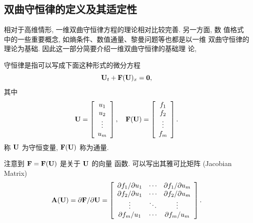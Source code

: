 \subsection{双曲守恒律的定义及其适定性}
\label{sec:hyperbolic-cl-def}

相对于高维情形, 一维双曲守恒律方程的理论相对比较完善. 另一方面, 数
值格式中的一些重要概念, 如熵条件、数值通量、黎曼问题等也都是以一维
双曲守恒律的理论为基础. 因此这一部分简要介绍一维双曲守恒律的基础理
论,
\begin{definition}
  守恒律是指可以写成下面这种形式的微分方程
  \begin{equation}
    \label{eq:conservation-law}
    {\bf{U}}_{t} + {\bf{F}}({\bf{U}})_{x} = {\bf{0}},
  \end{equation}
  其中
  \begin{equation}
    \label{eq:conserve-variable-and-vector-of-flux}
    {\bf{U}} = \left[
      \begin{array}{c}
        u_{1}\\
        u_{2}\\
        \vdots\\
        u_{m}
      \end{array}
    \right], \quad
    {\bf{F}}({\bf{U}}) = \left[
      \begin{array}{c}
        f_{1}\\
        f_{2}\\
        \vdots\\
        f_{m}
      \end{array}
    \right].
  \end{equation}
  称 ${\bf{U}}$ 为守恒变量, ${\bf{F}}({\bf{U}})$ 称为通量.
\end{definition}
注意到 ${\bf{F}} = {\bf{F}}({\bf{U}})$ 是关于 ${\bf{U}}$ 的向量
函数. 可以写出其雅可比矩阵 (Jacobian Matrix)
\begin{equation}
  \label{eq:jacobian-matrix-flux}
  {\bf{A}}({\bf{U}}) =
  {\partial {\bf{F}}}/{\partial {\bf{U}}} = \left[
    \begin{array}{ccc}
      \partial f_{1} / \partial u_{1} &\cdots & \partial f_{1}
      / \partial u_{m}\\
      \partial f_{2} / \partial u_{1} &\cdots & \partial f_{2}
      / \partial u_{m}\\
      \vdots & \ddots & \vdots\\
      \partial f_{m} / u_{1} & \cdots & \partial f_{m} / u_{m}
    \end{array}
  \right].
\end{equation}
